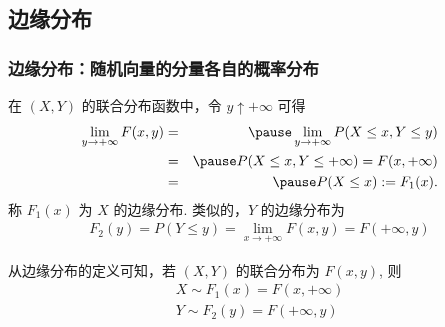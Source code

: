 \subsection{边缘分布}
\begin{frame}
  \frametitle{边缘分布：随机向量的分量各自的概率分布}
  \begin{defi}[边缘分布] 在 $(X,Y)$ 的联合分布函数中，令 $y\uparrow +\infty$ 可得
    \begin{eqnarray*}
      \lim_{y\rightarrow+\infty}F(x,y)&=&\pause \lim_{y\rightarrow+\infty}P(X\le x, Y\le y)\\ &=& \pause P(X\le x,Y\le +\infty)=F(x,+\infty)
      \\
      &=&\pause P(X\le x):=F_1(x).    \end{eqnarray*}
  称 $F_1 (x)$ 为 $X$ 的边缘分布. \pause 类似的，$Y$ 的边缘分布为
\begin{eqnarray*}
F_2(y)=P(Y\le y)=\lim_{x\rightarrow+\infty}F(x,y)=F(+\infty,y)
\end{eqnarray*}

\end{defi}

\pause 从边缘分布的定义可知，若 $(X,Y)$ 的联合分布为 $F (x,y)$, 则
\begin{eqnarray*}
X\sim F_1(x)=F(x,+\infty)\\
Y\sim F_2(y)=F(+\infty, y)
\end{eqnarray*}
\end{frame}

